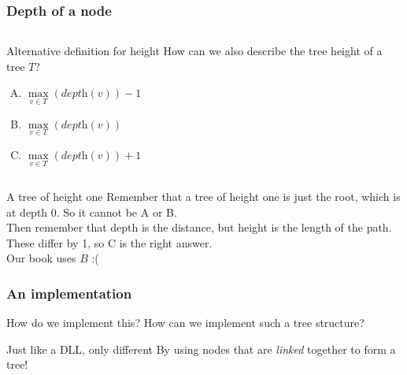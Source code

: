 \begin{frame}
	\frametitle{Depth of a node}

	\begin{columns}
		\begin{block}{Alternative definition for height}
			How can we also describe the tree height of a tree $T$?
			\pause
			\begin{enumerate}[A.]
				\item $\max\limits_{v\in T}({\textit{depth}(v)})-1$
				\item $\max\limits_{v\in T}({\textit{depth}(v)})$
				\item $\max\limits_{v\in T}({\textit{depth}(v)})+1$
			\end{enumerate}
		\end{block}
	\end{columns}
	\pause
	\begin{block}{A tree of height one}
		Remember that a tree of height one is just the root, which is at depth $0$. So it cannot be A or B.\\
		Then remember that depth is the distance, but height is the length of the path. These differ by 1, so C is the right
		answer.\\
		Our book uses $B$ :( 
	\end{block}
\end{frame}

\begin{frame}
	\frametitle{An implementation}
	
	\begin{block}{How do we implement this?}
		How can we implement such a tree structure?
	\end{block}
	\pause
	\begin{block}{Just like a DLL, only different}
		By using nodes that are \textit{linked} together to form a tree!
	\end{block}
	\pause
	\begin{columns}[t]
		\column{0.535\textwidth}
	
			
		\column{0.505\textwidth}
	
			
	\end{columns}
\end{frame}

